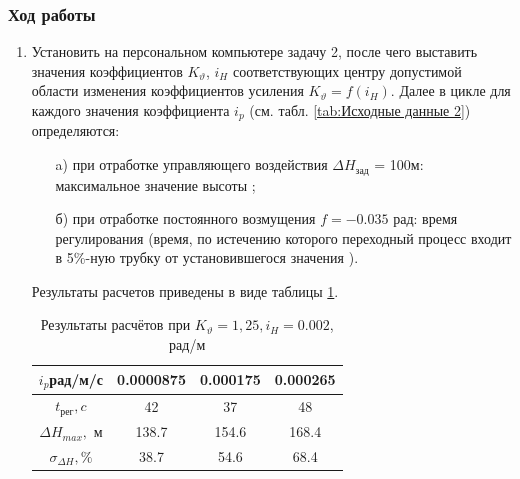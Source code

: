         \subsubsection{Ход работы}
            	\begin{enumerate}
		            \item Установить на персональном компьютере задачу 2, после чего выставить
                        значения коэффициентов $K_{\vartheta}$, $i_H$ соответствующих центру допустимой
                        области изменения коэффициентов усиления $K_{\vartheta}=f(i_H)$. Далее в цикле для
                        каждого значения коэффициента  $i_p$ (см. табл. \ref{tab:Исходные данные 2}) определяются:
                            \begin{itemize}
                                \item[a)] при отработке управляющего воздействия $\Delta H_{зад}$ = 100м:
                                        максимальное значение высоты ;
                                \item[б)] при отработке постоянного возмущения  $f=-0.035$ рад:
                                время регулирования   (время, по истечению которого переходный процесс  входит в 5\%-ную трубку от установившегося значения
                                ).
                            \end{itemize}
                            Результаты расчетов приведены в виде таблицы \ref{tab:Таблица с результатами лаба2}.
                            
                            \begin{table}[H]
                                \centering
                                \caption{Результаты расчётов при $K_{\vartheta}=1,25, i_H=0.002$, рад/м}
                                \begin{tabular}{|c|c|c|c|}
                                \hline
                                    $i_p$рад/м/с & 0.0000875 & 0.000175 &0.000265\\ \hline
                                    $t_{\text{рег}}, c$ & 42 & 37 &48\\ \hline
                                    $\Delta H_{max},$ м &  138.7  & 154.6 & 168.4 \\ \hline
                                    $\sigma_{\Delta H}, \%$  & 38.7  & 54.6  &  68.4 \\ \hline
                                \end{tabular}
                                \label{tab:Таблица с результатами лаба2}
                            \end{table}
                            

\end{enumerate}
